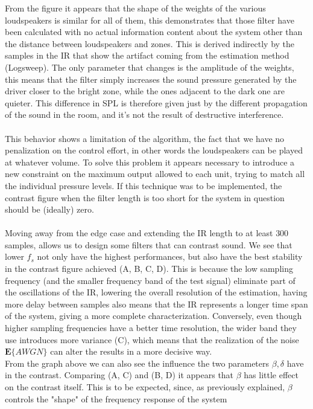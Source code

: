 From the figure it appears that the shape of the weights of the various loudspeakers is similar for all of them, this demonstrates that those filter have been calculated with no actual information content about the system other than the distance between loudspeakers and zones. This is derived indirectly by the samples in the IR that show the artifact coming from the estimation method (Logsweep). The only parameter that changes is the amplitude of the weights, this means that the filter simply increases the sound pressure generated by the driver closer to the bright zone, while the ones adjacent to the dark one are quieter. This difference in SPL is therefore given just by the different propagation of the sound in the room, and it's not the result of destructive interference.
\\
\\
This behavior shows a limitation of the algorithm, the fact that we have no penalization on the control effort, in other words the loudspeakers can be played at whatever volume. To solve this problem it appears necessary to introduce a new constraint on the maximum output allowed to each unit, trying to match all the individual pressure levels. If this technique was to be implemented, the contrast figure when the filter length is too short for the system in question should be (ideally) zero.
\\
\\
Moving away from the edge case and extending the IR length to at least $300$ samples, allows us to design some filters that can contrast sound. We see that lower $f_s$ not only have the highest performances, but also have the best stability in the contrast figure achieved (A, B, C, D). This is because the low sampling frequency (and the smaller frequency band of the test signal) eliminate part of the oscillations of the IR, lowering the overall resolution of the  estimation, having more delay between samples also means that the IR represents a longer time span of the system, giving a more complete characterization. Conversely, even though higher sampling frequencies have a better time resolution, the wider band they use introduces more variance (C), which means that the realization of the noise $\textbf{E}\{AWGN\}$ can alter the results in a more decisive way.
\\
From the graph above we can also see the influence the two parameters $\beta, \delta$ have in the contrast. Comparing (A, C) and (B, D) it appears that $\beta$ has little effect on the contrast itself. This is to be expected, since, as previously explained, $\beta$ controls the "shape" of the frequency response of the system

